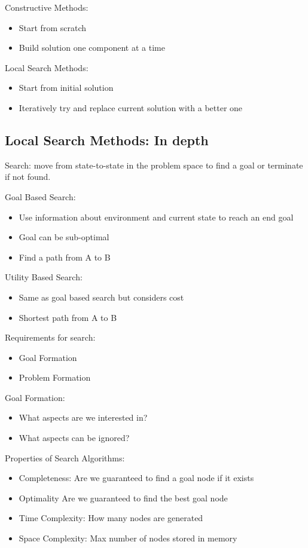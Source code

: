 \documentclass{article}
\begin{document}
    Constructive Methods:
    \begin{itemize}
        \item Start from scratch
        \item Build solution one component at a time
    \end{itemize}
    Local Search Methods:
    \begin{itemize}
        \item Start from initial solution
        \item Iteratively try and replace current solution with a better one
    \end{itemize}
\subsection{Local Search Methods: In depth}
    Search: move from state-to-state in the problem space to find a goal or terminate if not found.

    Goal Based Search:
    \begin{itemize}
        \item Use information about environment and current state to reach an end goal
        \item Goal can be sub-optimal
        \item Find a path from A to B
    \end{itemize}
    Utility Based Search:
    \begin{itemize}
        \item Same as goal based search but considers cost
        \item Shortest path from A to B
    \end{itemize}

    Requirements for search:
    \begin{itemize}
        \item Goal Formation
        \item Problem Formation
    \end{itemize}

    Goal Formation:
    \begin{itemize}
        \item What aspects are we interested in?
        \item What aspects can be ignored?
    \end{itemize}

    Properties of Search Algorithms:
    \begin{itemize}
        \item Completeness: Are we guaranteed to find a goal node if it exists
        \item Optimality Are we guaranteed to find the best goal node
        \item Time Complexity: How many nodes are generated
        \item Space Complexity: Max number of nodes stored in memory
    \end{itemize}
\end{document}
